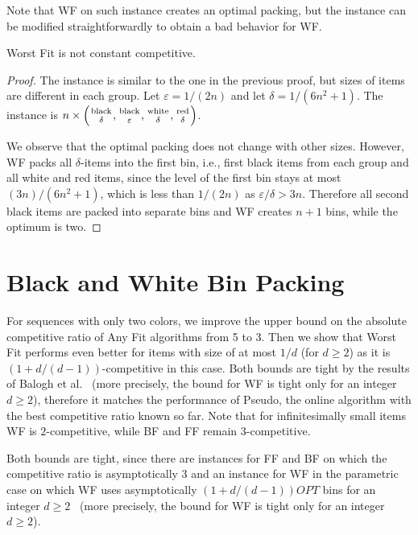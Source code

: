 \documentclass[11pt,a4paper]{article}
\def\vari#1{\mathit{#1}}
\newcommand*{\nolinefrac}[2]{\genfrac{}{}{0pt}{1}{#1}{#2}}
\begin{document}
Note that WF on such instance creates an optimal packing,
but the instance can be modified straightforwardly to obtain a bad behavior for WF.

\begin{proposition}
Worst Fit is not constant competitive.
\end{proposition}

\begin{proof}
The instance is similar to the one in the previous proof, but sizes of items are different in each group.
Let $\varepsilon = 1/(2n)$ and let $\delta = 1/(6n^2 + 1)$. The instance is
$n \times \left( \nolinefrac{\mathrm{black}}{\delta}, \nolinefrac{\mathrm{black}}{\varepsilon},
\nolinefrac{\mathrm{white}}{\delta}, \nolinefrac{\mathrm{red}}{\delta} \right)$.
 
We observe that the optimal packing does not change with other sizes.
However, WF packs all $\delta$-items into the first bin, i.e.,
first black items from each group and all white and red items,
since the level of the first bin stays at most $(3n)/(6n^2 + 1)$,
which is less than $1/(2n)$ as $\varepsilon/\delta > 3n$.
Therefore all second black items are packed into separate bins
and WF creates $n + 1$ bins, while the optimum is two.
\end{proof}

\section{Black and White Bin Packing}\label{sec:BWBP}

For sequences with only two colors,
we improve the upper bound on the absolute competitive ratio of Any Fit algorithms from 5 to 3.
Then we show that Worst Fit performs even better
for items with size of at most $1/d$ (for $d \geq 2$)
as it is $(1 + d/(d-1))$-competitive in this case.
Both bounds are tight by the results of Balogh et al.~\cite{balogh14}
(more precisely, the bound for WF is tight only for an integer $d \geq 2$),
therefore it matches the performance of Pseudo, the online algorithm with the best competitive
ratio known so far. Note that for infinitesimally small items WF is $2$-competitive,
while BF and FF remain $3$-competitive.

Both bounds are tight, since there are instances for FF and
BF on which the competitive ratio is asymptotically 3 and an instance
for WF in the parametric case on which WF uses asymptotically $(1 +
d/(d-1))\vari{OPT}$ bins for an integer $d \geq 2$~\cite{balogh14}
(more precisely, the bound for WF is tight only for an integer $d \geq 2$).
\end{document}
